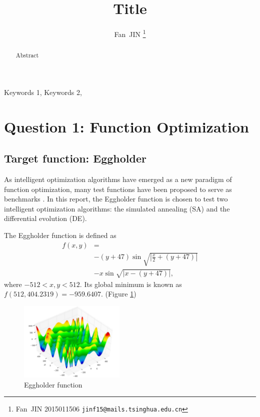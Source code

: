 \documentclass{IEEEtran}
\title{Title}
\author{
    Fan~JIN
    \thanks{Fan~JIN 2015011506  \texttt{jinf15@mails.tsinghua.edu.cn}}
}
\begin{document}
\maketitle
\begin{abstract}
    Abstract
\end{abstract}
\begin{IEEEkeywords}
    Keywords 1, Keywords 2,
\end{IEEEkeywords}

\section{Question 1: Function Optimization}
{
    \subsection{Target function: Eggholder}
    {
        As intelligent optimization algorithms have emerged as a new paradigm of function optimization, 
        many test functions have been proposed to serve as benchmarks \cite{wiki:Test_functions_for_optimization}.
        In this report, the Eggholder function is chosen to test two intelligent optimization algorithms:
        the simulated annealing (SA) and the differential evolution (DE).

        The Eggholder function is defined as
        \[
            \begin{split}
            f(x,y) &= \\
            &- (y+47) \sin{\sqrt{\left| \frac{x}{2}+(y+47) \right|}} \\
            &- x \sin{\sqrt{\left| x-(y+47) \right|}},
            \end{split}
        \]
        where $-512 < x,y < 512$.
        Its global minimum is known as $f(512, 404.2319) = -959.6407$. (Figure \ref{fig:eggholder})

        \begin{figure}[!htbp]
            \centering
            \includegraphics[width=0.45\textwidth]{figures/eggholder.png}
            \caption{Eggholder function \cite{wiki:Test_functions_for_optimization}}
            \label{fig:eggholder}
        \end{figure}

}}
\end{document}
